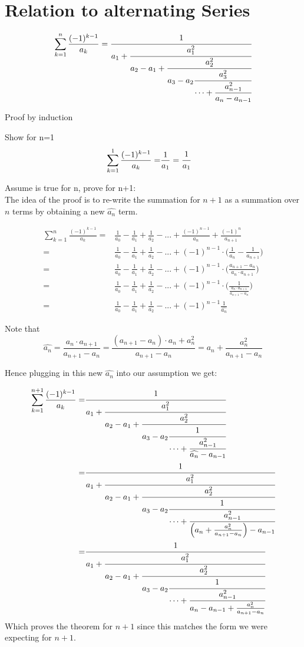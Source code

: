 \documentclass[a4paper]{article}
\begin{document}
\section{Relation to alternating Series}

\begin{theorem}\label{relation_to_series}
$$
\sum_{k=1}^{n} \frac{(-1)^{k-1}}{a_k} = \cfrac{1}{a_1+\cfrac{a_{1}^{2}}{a_2 - a_1 +\cfrac{a_2^2}{a_3 - a_2 
\cfrac{a_3^2}{\cdots + \cfrac{a_{n-1}^2}{a_n - a_{n-1}}}}}} 
$$

Proof by induction

Show for n=1
\begin{align*}
\sum_{k=1}^{1} \frac{(-1)^{k-1}}{a_k} =& \frac{1}{a_1} = \cfrac{1}{a_1}
\end{align*}

Assume is true for n, prove for n+1:
\\
The idea of the proof is to re-write the summation for $n+1$ as a summation over $n$ terms by obtaining a new $\widehat{a_n}$ term.

\begin{align*}
\sum_{k=1}^{n} \frac{(-1)^{k-1}}{a_k} =& \frac{1}{a_0} - \frac{1}{a_1} + \frac{1}{a_2} - ... + \frac{(-1)^{n-1}}{a_{n}} + \frac{(-1)^{n}}{a_{n+1}} 
\\
=& \frac{1}{a_0} - \frac{1}{a_1} + \frac{1}{a_2} - ... + (-1)^{n-1} \cdot \Big( \frac{1}{a_{n}} - \frac{1}{a_{n+1}} \Big)
\\
=& \frac{1}{a_0} - \frac{1}{a_1} + \frac{1}{a_2} - ... + (-1)^{n-1} \cdot \Big( \frac{a_{n+1} - a_{n}}{a_{n}\cdot a_{n+1}} \Big)
\\
=& \frac{1}{a_0} - \frac{1}{a_1} + \frac{1}{a_2} - ... + (-1)^{n-1} \cdot \Big( \frac{1}{\frac{a_{n}\cdot a_{n+1}}{a_{n+1} - a_{n}}}  \Big)
\\
=& \frac{1}{a_0} - \frac{1}{a_1} + \frac{1}{a_2} - ... + (-1)^{n-1} \frac{1}{\widehat{a_n}}
\end{align*}

Note that 
\begin{equation*}
\widehat{a_n} 
=
\frac{a_{n}\cdot a_{n+1}}{a_{n+1} - a_{n}} = 
\frac{(a_{n+1} - a_n)\cdot a_{n} + a_n^2}{a_{n+1} - a_{n}} = a_{n} + \frac{a_n^2}{a_{n+1} - a_{n}}
\end{equation*}

Hence plugging in this new $\widehat{a_n}$ into our assumption we get:

\begin{align*}
\sum_{k=1}^{n+1} \frac{(-1)^{k-1}}{a_k} =& \cfrac{1}{a_1+\cfrac{a_{1}^{2}}{a_2 - a_1 +\cfrac{a_2^2}{a_3 - a_2 
\cfrac{1}{\cdots + \cfrac{a_{n-1}^2}{\widehat{a_n} - a_{n-1}}}}}} 
\\
=& \cfrac{1}{a_1+\cfrac{a_{1}^{2}}{a_2 - a_1 +\cfrac{a_2^2}{a_3 - a_2 
\cfrac{1}{\cdots + \cfrac{a_{n-1}^2}{\Big( a_{n} + \frac{a_n^2}{a_{n+1} - a_{n}} \Big) - a_{n-1}}}}}} 
\\
=& \cfrac{1}{a_1+\cfrac{a_{1}^{2}}{a_2 - a_1 +\cfrac{a_2^2}{a_3 - a_2 
\cfrac{1}{\cdots + \cfrac{a_{n-1}^2}{a_{n} - a_{n-1} + \frac{a_n^2}{a_{n+1} - a_{n}} }}}}}
\end{align*}
Which proves the theorem for $n+1$ since this matches the form we were expecting for $n+1$. 


\end{theorem}
\end{document}
